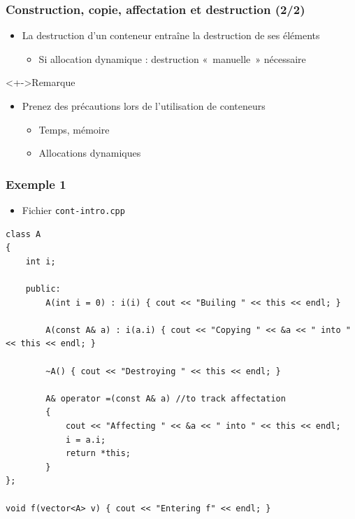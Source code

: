 \begin{frame}
\frametitle{Construction, copie, affectation et destruction (2/2)}
\begin{itemize}[<+->]
\item La destruction d'un conteneur entraîne la destruction de ses éléments
	\begin{itemize}
	\item Si allocation dynamique : destruction «~manuelle~» nécessaire
	\end{itemize}
\end{itemize}
\begin{alertblock}<+->{Remarque}
	\begin{itemize}[<+->]
	\item Prenez des précautions lors de l'utilisation de conteneurs
		\begin{itemize}
		\item Temps, mémoire
		\item Allocations dynamiques
		\end{itemize}
	\end{itemize}
\end{alertblock}
\end{frame}

\begin{frame}[containsverbatim]
\frametitle{Exemple 1}
\begin{itemize}
\item Fichier \texttt{cont-intro.cpp}
\end{itemize}
\begin{lstlisting}
class A
{
	int i;

	public:
		A(int i = 0) : i(i) { cout << "Builing " << this << endl; }
		
		A(const A& a) : i(a.i) { cout << "Copying " << &a << " into " << this << endl; }
		
		~A() { cout << "Destroying " << this << endl; }
		
		A& operator =(const A& a) //to track affectation
		{ 
			cout << "Affecting " << &a << " into " << this << endl;
			i = a.i;
			return *this;
		}		
};

void f(vector<A> v) { cout << "Entering f" << endl; }
\end{lstlisting}
\end{frame}

